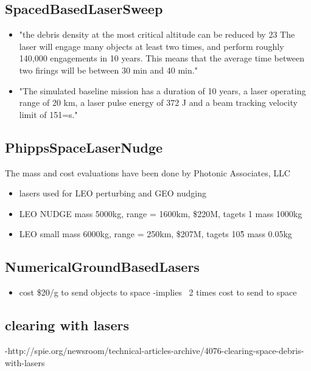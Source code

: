 \documentclass{article}
\begin{document}
\subsection{SpacedBasedLaserSweep}\cite{SpaceBasedLaserSweep}
\begin{itemize}
\item  "the debris density at the most critical
altitude can be reduced by 23%
The laser will engage many objects at least two times, and
perform roughly 140,000 engagements in 10 years. This
means that the average time between two firings will be
between 30 min and 40 min."
\item "The simulated baseline mission has a duration of 10
years, a laser operating range of 20 km, a laser pulse
energy of 372 J and a beam tracking velocity limit of 151=s."
\end{itemize}

\subsection{PhippsSpaceLaserNudge}\cite{PhippsSpaceLaserNudge}


The mass and cost evaluations have been done by Photonic Associates, LLC 
\begin{itemize}
\item lasers used for LEO perturbing and GEO nudging
\item LEO NUDGE mass 5000kg, range = 1600km, \$220M, tagets 1 mass 1000kg
\item LEO small mass 6000kg, range = 250km, \$207M, tagets 10\^5 mass 0.05kg
\end{itemize}

\subsection{NumericalGroundBasedLasers}\cite{NumericalGroundBasedLasers}

\begin{itemize}
\item cost \$20/g to send objects to space
-implies ~2 times cost to send to space
\end{itemize}

\subsection{clearing with lasers}
-http://spie.org/newsroom/technical-articles-archive/4076-clearing-space-debris-with-lasers
\end{document}
